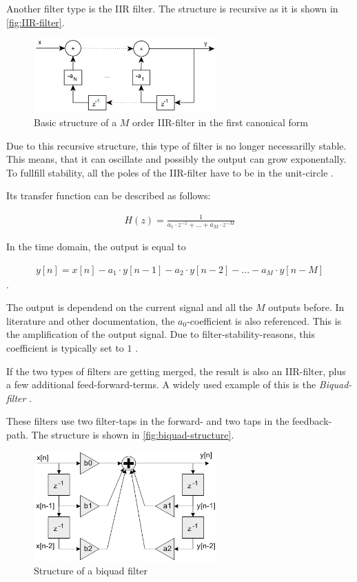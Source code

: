 Another filter type is the \ac{IIR} filter. The structure is recursive as it is shown in \autoref{fig:IIR-filter}.

\begin{figure}[!h]
    \centering
    \includegraphics[width=7cm]{img/iir.png}
    \caption{Basic structure of a $M$ order \ac{IIR}-filter in the first canonical form \cite{meyer_signalverarbeitung}}
    \label{fig:IIR-filter}
\end{figure}

Due to this recursive structure, this type of filter is no longer necessarilly stable. This means, that it can
oscillate and possibly the output can grow exponentally. To fullfill stability, all the poles of the
\ac{IIR}-filter have to be in the unit-circle \cite{meyer_signalverarbeitung}.

Its transfer function can be described as follows:

\begin{align}
    H(z) = \frac{1}{a_1 \cdot z^{-1} + ... + a_M \cdot z^{-M}}
\end{align}

In the time domain, the output is equal to

\begin{align}
    y[n] = x[n] - a_1 \cdot y[n-1] - a_2 \cdot y[n-2] - ... - a_M \cdot y[n-M]
\end{align}
.

The output is dependend on the current signal and all the $M$ outputs before. In literature and other documentation,
the $a_0$-coefficient is also referenced. This is the amplification of the output signal. Due to filter-stability-reasons,
this coefficient is typically set to $1$ \cite{arm_dsp} \cite{cookbook_audio}.

If the two types of filters are getting merged, the result is also an \ac{IIR}-filter, plus
a few additional feed-forward-terms. A widely used example of this is the \textit{Biquad-filter} \cite{arm_dsp}.

These filters use two filter-taps in the forward- and two taps in the feedback-path. The structure
is shown in \autoref{fig:biquad-structure}.

\begin{figure}[!h]
    \centering
    \includegraphics[width=7cm]{img/biquad_structure.png}
    \caption{Structure of a biquad filter \cite{arm_dsp}}
    \label{fig:biquad-structure}
\end{figure}

